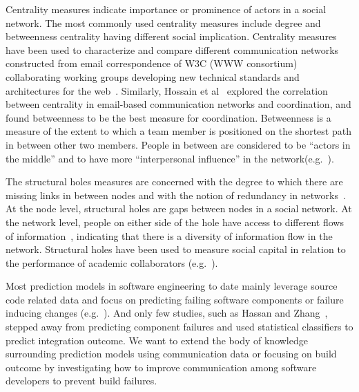 Centrality measures indicate importance or prominence of actors in a
social network. The most commonly used centrality measures include degree and
betweenness centrality having different social implication. Centrality measures
have been used to characterize and compare different communication networks
constructed from email correspondence of W3C (WWW consortium) collaborating
working groups developing new technical standards and architectures for the
web~\cite{Gloor:2003cikm}. Similarly, Hossain et al~\cite{hossain:cscw:2006}
explored the correlation between centrality in email-based communication networks
and coordination, and found betweenness to be the best measure for coordination.
Betweenness is a measure of the extent to which a team member is
positioned on the shortest path in between other two members. People in between
are considered to be ``actors in the middle'' and to have more ``interpersonal
influence'' in the
network(e.g.~\cite{Gloor:2003cikm,zimmermann:icse:2008,hossain:cscw:2006}).

The structural holes measures are concerned with the degree to which there
are missing links in between nodes and with the notion of redundancy in
networks~\cite{Burt:1995vo}. At the node level, structural holes are gaps between
nodes in a social network. At the network level, people on either side of the
hole have access to different flows of information~\cite{Hargadon:1997asq},
indicating that there is a diversity of information flow in the network.
Structural holes have been used to measure social capital in relation to the
performance of academic collaborators (e.g.~\cite{Brambila:PICMET2007}).

Most prediction models in software engineering to date mainly leverage source
code related data and focus on predicting failing software components or failure
inducing changes
(e.g.~\cite{bell:2005tse,schroeter:isese:2006,zimmermann:icse:2008,kim:2008tse}).
And only few studies, such as Hassan and Zhang~\cite{hassan:ase:2006}, stepped away
from predicting component failures and used statistical classifiers to predict
integration outcome.
We want to extend the body of knowledge surrounding prediction models using communication data or focusing on build outcome by investigating how to improve communication among software developers to prevent build failures.







